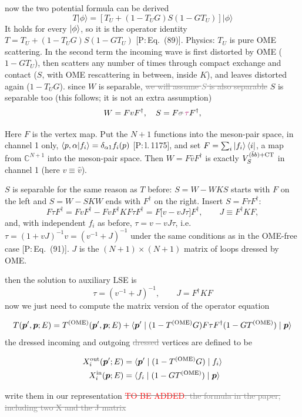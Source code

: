 \documentclass[11pt,a4paper]{article}
\newcommand{\tagP}[1]{\textcolor{blue!65!black}{\textsf{\small[P:\,#1]}}}
\renewcommand{\TOME}{T^{\rm (OME)}}
\newcommand{\todo}{\textcolor{red}{TO BE ADDED}}
\newcommand{\ai}[1]{\textcolor{aicolor}{#1}}
\newcommand{\aifix}[2]{\textcolor{gray}{\sout{#1}} \textcolor{aicolor}{#2}}
\newcommand{\aifixm}[2]{\textcolor{gray}{\text{\sout{$#1$}}}\,\textcolor{aicolor}{#2}}
\newcommand{\ai}[1]{#1}
\newcommand{\aifix}[2]{#2}
\newcommand{\aifixm}[2]{#2}
\newenvironment{aiadd}{\par}{\par}
\begin{document}
now the two potential formula can be derived
\[
	T\lvert \phi \rangle = \left[T_U + (1 - T_UG)S(1-GT_U)\right]\lvert \phi \rangle
\]
\ai{It holds for every $\ket\phi$, so it is the operator identity $T=T_U+(1-T_UG)S(1-GT_U)$ \tagP{Eq.~(89)}. Physics: $T_U$ is pure OME scattering. In the second term the incoming wave is first distorted by OME ($1-GT_U$), then scatters any number of times through compact exchange and contact ($S$, with OME rescattering in between, inside $K$), and leaves distorted again ($1-T_UG$).}
since $W$ is separable, \aifix{we will assume $S$ is also separable}{$S$ is separable too (this follows; it is not an extra assumption)}
\[
	W = Fv F^\dagger,\quad S = F\aifixm{\sigma}{\tau} F^\dagger,
\]
\begin{aiadd}
	Here $F$ is the vertex map. Put the $N+1$ functions into the meson-pair space, in channel 1 only, $\braket{p,\alpha|f_i}=\delta_{\alpha1}f_i(p)$ \tagP{l.\,1175}, and set $F=\sum_i\ket{f_i}\bra i$, a map from $\mathbb C^{N+1}$ into the meson-pair space. Then $W=F\hat vF^\dagger$ is exactly $V^{(\bar bb)+{\rm CT}}_S$ in channel 1 (here $v\equiv\hat v$).

	$S$ is separable for the same reason as $T$ before: $S=W-WKS$ starts with $F$ on the left and $S=W-SKW$ ends with $F^\dagger$ on the right. Insert $S=F\tau F^\dagger$:
	\[
		F\tau F^\dagger=FvF^\dagger-FvF^\dagger KF\tau F^\dagger=F\big[v-vJ\tau\big]F^\dagger,\qquad J\equiv F^\dagger KF,
	\]
	and, with independent $f_i$ as before, $\tau=v-vJ\tau$, i.e.\ $\tau=(1+vJ)^{-1}v=(v^{-1}+J)^{-1}$ under the same conditions as in the OME-free case \tagP{Eq.~(91)}. $J$ is the $(N+1)\times(N+1)$ matrix of loops dressed by OME.
\end{aiadd}
then the solution to auxiliary LSE is
\[
	\tau = (v^{-1} + J)^{-1},\qquad J = F^\dagger K F
\]
now we just need to compute the matrix version of the operator equation

\[
	T(\vep',\vep; E) = \TOME(\vep', \vep; E) + \langle \vep' \mid (1 - \TOME G)F\tau F^\dagger(1 - G\TOME)\mid \vep \rangle
\]
the dressed incoming and outgoing \aifix{dressed}{} vertices are defined to be

\begin{align}
	X^{\rm out}_i(\vep'; E) & = \langle \vep' \mid (1 - \TOME G)\mid f_i \rangle \\
	X^{\rm in}_i(\vep; E)   & = \langle f_i \mid (1 - G\TOME)\mid \vep \rangle
\end{align}

write them in our representation \aifix{\todo: the formula in the paper, including two X and the J matrix}{}
\end{document}
